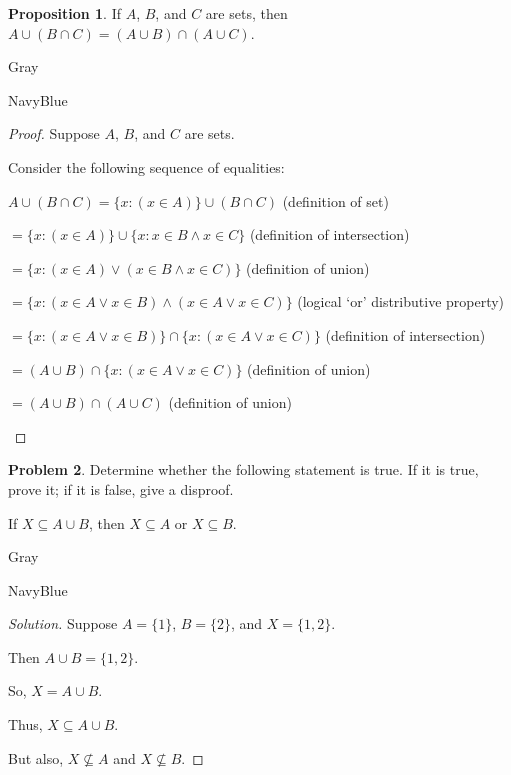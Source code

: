 \documentclass[12pt]{amsart}
\newcounter{problem_number}[section]
\theoremstyle{named}
\newenvironment{prf}
{\medskip\begin{color}{Gray}\begin{framed}\begin{color}{NavyBlue}\begin{proof}[Proof]
\doublespacing}
{\end{proof}\end{color}\end{framed}\end{color}\medskip}
\newenvironment{soln}
{\begin{color}{Gray}\begin{framed}\begin{color}{NavyBlue}\begin{proof}[Solution]
\doublespacing}
{\end{proof}\end{color}\end{framed}\end{color}}
\theoremstyle{definition}
\newtheorem{proposition}{Proposition}
\newtheorem{problem}[proposition]{Problem}
\begin{document}
\phantom{ }

\phantom{ }

\begin{proposition}
	If $A$, $B$, and $C$ are sets, then $A\cup(B\cap C) = (A\cup B)\cap(A\cup C)$.
	
\end{proposition}

\begin{prf}
	\phantom{ }

	Suppose $A$, $B$, and $C$ are sets.

	Consider the following sequence of equalities:

	\begin{adjustwidth}{2em}{0em}
		$A \cup (B \cap C) = \{x : (x \in A)\} \cup (B \cap C)$ \hfill (definition of set)

		$=\{x : (x \in A)\} \cup \{x: x \in B \land x \in C\}$ \hfill (definition of intersection)

		$=\{x : (x \in A) \lor (x \in B \land x \in C)\}$ \hfill (definition of union)

		$=\{x : (x \in A \lor x \in B) \land (x \in A \lor x \in C)\}$ \hfill (logical `or' distributive property)
	
		$=\{x : (x \in A \lor x \in B)\} \cap \{x: (x \in A \lor x \in C)\}$ \hfill (definition of intersection)
		
		$=(A \cup B) \cap \{x: (x \in A \lor x \in C)\}$ \hfill (definition of union)

		$=(A \cup B) \cap (A \cup C)$ \hfill (definition of union)
	
	\end{adjustwidth}

\end{prf}

\begin{problem}
	Determine whether the following statement is true.
	If it is true, prove it; if it is false, give a disproof.
	\begin{center}
		If $X\subseteq A\cup B$, then $X\subseteq A$ or $X\subseteq B$.
	\end{center}
\end{problem}

\begin{soln}
	\phantom{ }

	Suppose $A = \{1\}$, $B = \{2\}$, and $X = \{1,2\}$.

	Then $A \cup B = \{1, 2\}$.

	So, $X = A \cup B$.

	Thus, $X \subseteq A \cup B$.

	But also, $X \nsubseteq A$ and $X \nsubseteq B$.
\end{soln}
\end{document}
